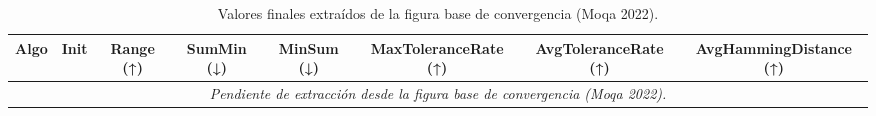 
\begin{table}[H]
    \centering
    \begin{tabular}{llcccccc}
        \toprule
        Algo & Init & Range (↑) & SumMin (↓) & MinSum (↓) & MaxToleranceRate (↑) & AvgToleranceRate (↑) & AvgHammingDistance (↑) \\
        \midrule
        \multicolumn{8}{c}{\textit{Pendiente de extracción desde la figura base de convergencia (Moqa 2022).}} \\
        \bottomrule
    \end{tabular}
    \caption{Valores finales extraídos de la figura base de convergencia (Moqa 2022).}
    \label{tab:moqa_convergencia_finales}
\end{table}
